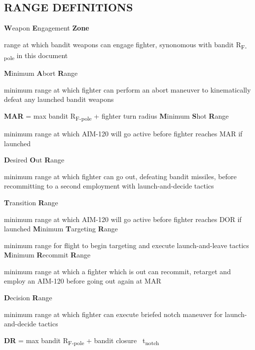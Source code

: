 \subsection{RANGE DEFINITIONS}

\begin{tcoloritemize}
     \textbf{W}eapon \textbf{E}ngagement \textbf{Zone}

    \medskip
    range at which bandit weapons can engage fighter, synonomous with bandit R\textsubscript{F-pole} in this document

    \blueitem[MAR] \textbf{M}inimum \textbf{A}bort \textbf{R}ange

    \medskip
    minimum range at which fighter can perform an abort maneuver to kinematically defeat any launched bandit weapons 

    \medskip
    \textbf{MAR} = max bandit R\textsubscript{F-pole} + fighter turn radius
    \blueitem[MSR] \textbf{M}inimum \textbf{S}hot \textbf{R}ange

    \medskip
    minimum range at which AIM-120 will go active before fighter reaches MAR if launched

    \blueitem[DOR] \textbf{D}esired \textbf{O}ut \textbf{R}ange

    \medskip
    minimum range at which fighter can go out, defeating bandit missiles, 
    before recommitting to a second employment with launch-and-decide tactics

    \blueitem[TR] \textbf{T}ransition \textbf{R}ange

    \medskip
    minimum range at which AIM-120 will go active before fighter reaches DOR if launched
    \blueitem[MTR] \textbf{M}inimum \textbf{T}argeting \textbf{R}ange

    \medskip
    minimum range for flight to begin targeting and execute launch-and-leave tactics
    \blueitem[MRR] \textbf{M}inimum \textbf{R}ecommit \textbf{R}ange

    \medskip
    minimum range at which a fighter which is out can recommit, 
    retarget and employ an AIM-120 before going out again at MAR

    \blueitem[DR] \textbf{D}ecision \textbf{R}ange

    \medskip
    minimum range at which fighter can execute briefed notch maneuver for launch-and-decide tactics

    \medskip

    \textbf{DR} = max bandit R\textsubscript{F-pole} + bandit closure \times \ t\textsubscript{notch}
\end{tcoloritemize}

